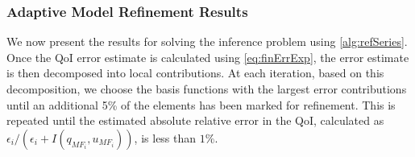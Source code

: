 \documentclass[review]{siamart0516}
\begin{document}
\subsubsection{Adaptive Model Refinement Results} \label{sec:cdvcdrBaseRef}
%

We now present the results for solving the inference problem using \cref{alg:refSeries}. Once the QoI error estimate is calculated using \cref{eq:finErrExp}, the error estimate is then decomposed into local contributions. At each iteration, based on this decomposition, we choose the basis functions with the largest error contributions until an additional 5\% of the elements has been marked for refinement. This is repeated until the estimated absolute relative error in the QoI, calculated as $\epsilon_i/(\epsilon_i+I(q_{MF_i},u_{MF_i}))$, is less than $1\%$.
\end{document}
